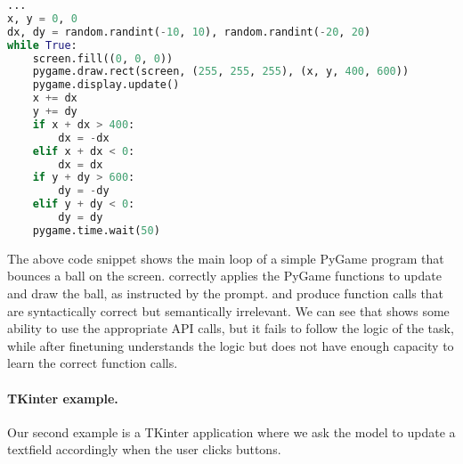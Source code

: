 \begin{AIbox}{}
\begin{minipage}[t]{0.33\linewidth}
\textbf{\phionesmall}
\begin{lstlisting}[language=Python, style=mystyle]
...
x, y = 0, 0
dx, dy = random.randint(-10, 10), random.randint(-20, 20)
while True:
    screen.fill((0, 0, 0))
    pygame.draw.rect(screen, (255, 255, 255), (x, y, 400, 600))
    pygame.display.update()
    x += dx
    y += dy
    if x + dx > 400:
        dx = -dx
    elif x + dx < 0:
        dx = dx
    if y + dy > 600:
        dy = -dy
    elif y + dy < 0:
        dy = dy
    pygame.time.wait(50)
\end{lstlisting}
\end{minipage}
\end{AIbox}

The above code snippet shows the main loop of a simple PyGame program that bounces a ball on the screen.
\phione correctly applies the PyGame functions to update and draw the ball, as instructed by the prompt. \phionebase and \phionesmall produce function calls that are syntactically correct but semantically irrelevant. We can see that \phionebase shows some ability to use the appropriate API calls, but it fails to follow the logic of the task, while \phionesmall after finetuning understands the logic but does not have enough capacity to learn the correct function calls.
\clearpage
\paragraph{TKinter example.} Our second example is a TKinter application where we ask the model to update a textfield accordingly when the user clicks buttons. 

